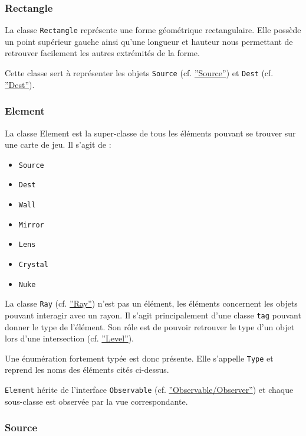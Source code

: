 \documentclass[]{article}
\begin{document}
\subsubsection{\label{Rectangle}Rectangle}

La classe \texttt{Rectangle} représente une forme géométrique rectangulaire.
Elle possède un point supérieur gauche ainsi qu'une longueur et hauteur 
nous permettant de retrouver facilement les autres extrémités de la 
forme.

Cette classe sert à représenter les objets \texttt{Source} (cf. \hyperref[Source]{''Source''}) et \texttt{Dest} (cf. \hyperref[Dest]{''Dest''}).

\subsubsection{\label{Element}Element}

La classe Element est la super-classe de tous les éléments pouvant
se trouver sur une carte de jeu.
Il s'agit de :

\begin{itemize}
    \item \texttt{Source}
    \item \texttt{Dest}
    \item \texttt{Wall}
    \item \texttt{Mirror}
    \item \texttt{Lens}
    \item \texttt{Crystal}
    \item \texttt{Nuke}
\end{itemize}

La classe \texttt{Ray} (cf. \hyperref[Ray]{''Ray''}) n’est pas un élément, les éléments concernent 
les objets pouvant interagir avec un rayon.
Il s'agit principalement d'une classe \texttt{tag} pouvant
donner le type de l'élément. Son rôle est de pouvoir retrouver
le type d'un objet lors d'une intersection (cf. \hyperref[Level]{''Level''}).

Une énumération fortement typée est donc présente. Elle s'appelle
\texttt{Type} et reprend les noms des éléments cités ci-dessus.

\texttt{Element} hérite de l'interface \texttt{Observable} (cf. \hyperref[OO]{''Observable/Observer''}) et chaque
sous-classe est observée par la vue correspondante.
    
\subsubsection{\label{Source}Source}
\end{document}
